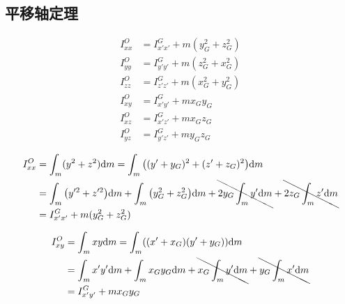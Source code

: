 \subsection{平移轴定理}
\begin{equation}
  \begin{split}
    I^O_{xx}&=I^G_{x'x'}+m(y^2_G+z^2_G)\\
    I^O_{yy}&=I^G_{y'y'}+m(z^2_G+x^2_G)\\
    I^O_{zz}&=I^G_{z'z'}+m(x^2_G+y^2_G)\\
    I^O_{xy}&=I^G_{x'y'}+mx_Gy_G\\
    I^O_{xz}&=I^G_{x'z'}+mx_Gz_G\\
    I^O_{yz}&=I^G_{y'z'}+my_Gz_G
  \end{split}
\end{equation}

\begin{equation}
  \begin{split}
    I^O_{xx}&=\int_m(y^2+z^2)\mathrm{d}m=\int_m\qty((y'+y_G)^2+(z'+z_G)^2)\mathrm{d}m\\
    &=\int_m\qty(y'^2+z'^2)\mathrm{d}m+\int_m\qty(y_G^2+z_G^2)\mathrm{d}m+\bcancel{2y_G\int_my'\mathrm{d}m}+\bcancel{2z_G\int_mz'\mathrm{d}m}\\
    &=I^G_{x'x'}+m(y_G^2+z_G^2)
  \end{split}
\end{equation}

\begin{equation}
  \begin{split}
    I^O_{xy}&=\int_mxy\mathrm{d}m=\int_m((x'+x_G)(y'+y_G))\mathrm{d}m\\
    &=\int_mx'y'\mathrm{d}m+\int_mx_Gy_G\mathrm{d}m+\bcancel{x_G\int_my'\mathrm{d}m}+\bcancel{y_G\int_mx'\mathrm{d}m}\\
    &=I^G_{x'y'}+mx_Gy_G
  \end{split}
\end{equation}